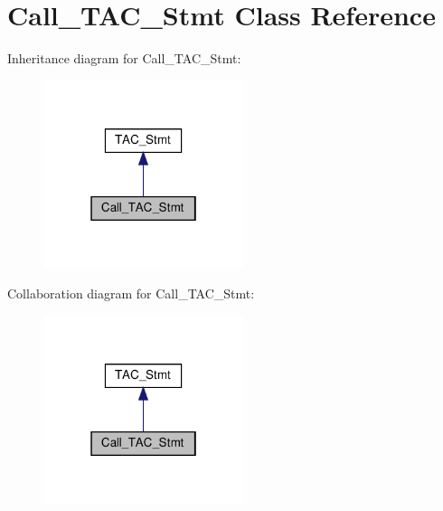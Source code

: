 \hypertarget{classCall__TAC__Stmt}{}\section{Call\+\_\+\+T\+A\+C\+\_\+\+Stmt Class Reference}
\label{classCall__TAC__Stmt}


Inheritance diagram for Call\+\_\+\+T\+A\+C\+\_\+\+Stmt\+:
\nopagebreak
\begin{figure}[H]
\begin{center}
\leavevmode
\includegraphics[width=166pt]{classCall__TAC__Stmt__inherit__graph}
\end{center}
\end{figure}


Collaboration diagram for Call\+\_\+\+T\+A\+C\+\_\+\+Stmt\+:
\nopagebreak
\begin{figure}[H]
\begin{center}
\leavevmode
\includegraphics[width=166pt]{classCall__TAC__Stmt__coll__graph}
\end{center}
\end{figure}
